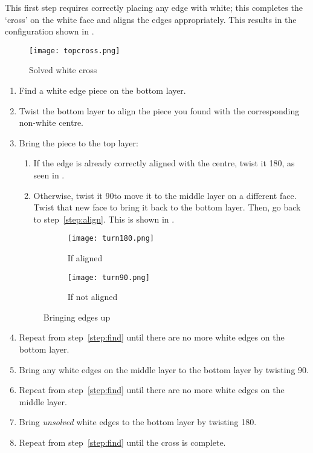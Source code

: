 	This first step requires correctly placing any edge with white; this completes the `cross' on the white face and aligns the edges appropriately. This results in the configuration shown in .
\begin{figure}[h]
	\centering
	\texttt{[image: topcross.png]}
	\caption{Solved white cross}\label{fig:topcross}
\end{figure}

\begin{enumerate}
	\item \label{step:find} Find a white edge piece on the bottom layer.
	\item \label{step:align} Twist the bottom layer to align the piece you found with the corresponding non-white centre.
	\item Bring the piece to the top layer:\begin{enumerate}
		\item If the edge is already correctly aligned with the centre, twist it 180\degree , as seen in .
		\item Otherwise, twist it 90\degree to move it to the middle layer on a different face. Twist that new face to bring it back to the bottom layer. Then, go back to step~\ref{step:align}. This is shown in .
	\end{enumerate}
\begin{figure}[h]
	\centering
	\begin{subfigure}[b]{0.3\textwidth}
		\texttt{[image: turn180.png]}
		\caption{If aligned}{\label{fig:edgeup180}}
	\end{subfigure}
	\begin{subfigure}[b]{0.3\textwidth}
		\texttt{[image: turn90.png]}
		\caption{If not aligned}{\label{fig:edgeup90}}
	\end{subfigure}
	\caption{Bringing edges up}
\end{figure}
\newpage
	\item Repeat from step~\ref{step:find} until there are no more white edges on the bottom layer.
	\item Bring any white edges on the middle layer to the bottom layer by twisting 90\degree .
	\item Repeat from step~\ref{step:find} until there are no more white edges on the middle layer.
	\item Bring \emph{unsolved} white edges to the bottom layer by twisting 180\degree .
	\item Repeat from step~\ref{step:find} until the cross is complete.
\end{enumerate}

